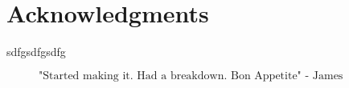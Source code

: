 \chapter{Acknowledgments}
sdfgsdfgsdfg



\begin{figure}[b]
$$\mbox{"Started making it. Had a breakdown. Bon Appetite" - James Acaster}$$
\end{figure}
